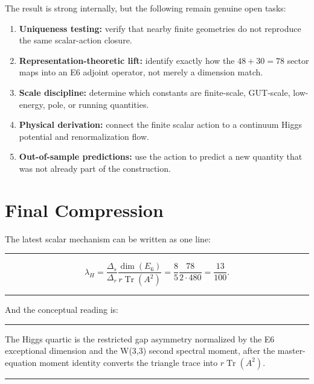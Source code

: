 \documentclass[11pt]{article}
\theoremstyle{definition}
\newcommand{\Tr}{\operatorname{Tr}}
\newcommand{\lamH}{\lambda_H}
\newcommand{\Deltar}{\Delta_r}
\newcommand{\Deltas}{\Delta_s}
\newenvironment{keybox}{%
  \begin{center}\begin{minipage}{0.94\linewidth}\color{darkblue}\hrule\vspace{0.6em}
}{%
  \vspace{0.6em}\hrule\end{minipage}\end{center}
}
\newenvironment{graybox}{%
  \begin{center}\begin{minipage}{0.94\linewidth}\hrule\vspace{0.6em}
}{%
  \vspace{0.6em}\hrule\end{minipage}\end{center}
}
\begin{document}
The result is strong internally, but the following remain genuine open tasks:
\begin{enumerate}[leftmargin=2em]
  \item \textbf{Uniqueness testing:} verify that nearby finite geometries do not reproduce the same scalar-action closure.
  \item \textbf{Representation-theoretic lift:} identify exactly how the \(48+30=78\) sector maps into an E6 adjoint operator, not merely a dimension match.
  \item \textbf{Scale discipline:} determine which constants are finite-scale, GUT-scale, low-energy, pole, or running quantities.
  \item \textbf{Physical derivation:} connect the finite scalar action to a continuum Higgs potential and renormalization flow.
  \item \textbf{Out-of-sample predictions:} use the action to predict a new quantity that was not already part of the construction.
\end{enumerate}

\section{Final Compression}

The latest scalar mechanism can be written as one line:

\begin{keybox}
\[
\boxed{
\lamH
=\frac{\Deltas}{\Deltar}\frac{\dim(E_6)}{r\Tr(A^2)}
=\frac{8}{5}\frac{78}{2\cdot480}
=\frac{13}{100}.
}
\]
\end{keybox}

And the conceptual reading is:

\begin{graybox}
The Higgs quartic is the restricted gap asymmetry normalized by the E6 exceptional dimension and the W(3,3) second spectral moment, after the master-equation moment identity converts the triangle trace into \(r\Tr(A^2)\).
\end{graybox}
\end{document}
